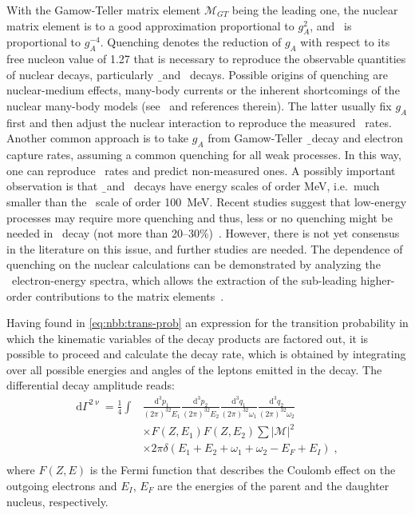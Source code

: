 With the Gamow-Teller matrix element $\mathcal{M}_{GT}$ being the leading one, the nuclear
matrix element is to a good approximation proportional to $g_A^2$, and \thalftwo\ is
proportional to $g_A^{-4}$. Quenching denotes the reduction of $g_A$ with respect to its
free nucleon value of 1.27 that is necessary to reproduce the observable quantities of
nuclear decays, particularly \b\ and \nnbb\ decays.  Possible origins of quenching are
nuclear-medium effects, many-body currents or the inherent shortcomings of the nuclear
many-body models (see~\cite{Suhonen2017} and references therein). The latter usually fix
$g_A$ first and then adjust the nuclear interaction to reproduce the measured \nnbb\
rates.  Another common approach is to take $g_A$ from Gamow-Teller \b\ decay and electron
capture rates, assuming a common quenching for all weak processes. In this way, one can
reproduce \nnbb\ rates and predict non-measured ones. A possibly important observation is
that \b\ and \nnbb\ decays have energy scales of order MeV, i.e.~much smaller than the
\onbb\ scale of order 100~MeV. Recent studies suggest that low-energy processes may
require more quenching and thus, less or no quenching might be needed in \onbb\ decay (not
more than 20--30\%)~\cite{Menendez2011, Engel2014, Ekstrom2014}.  However, there is not
yet consensus in the literature on this issue, and further studies are needed. The
dependence of quenching on the nuclear calculations can be demonstrated by analyzing the
\nnbb\ electron-energy spectra, which allows the extraction of the sub-leading
higher-order contributions to the matrix elements~\cite{Gando2019}.

Having found in \cref{eq:nbb:trans-prob} an expression for the transition probability in
which the kinematic variables of the decay products are factored out, it is possible to
proceed and calculate the decay rate, which is obtained by integrating over all possible
energies and angles of the leptons emitted in the decay.  The differential decay amplitude
reads:
\[
  \begin{split}
    \text{d}\Gamma^{2\upnu} =
      \frac{1}{4} \int & \frac{\text{d}^3p_1}{(2\pi)^32E_1}
                         \frac{\text{d}^3p_2}{(2\pi)^32E_2}
                         \frac{\text{d}^3q_1}{(2\pi)^32\omega_1}
                         \frac{\text{d}^3q_2}{(2\pi)^32\omega_2} \\
                       & \times F(Z,E_1) F(Z,E_2) \sum |\mathcal{M}|^2 \\
                       & \times 2\pi\delta (E_1 + E_2 + \omega_1 +
                         \omega_2 - E_F + E_I) \;, \\
  \end{split}
\]
where $F(Z,E)$ is the Fermi function that describes the Coulomb effect on the outgoing
electrons and $E_I$, $E_F$ are the energies of the parent and the daughter nucleus,
respectively.

